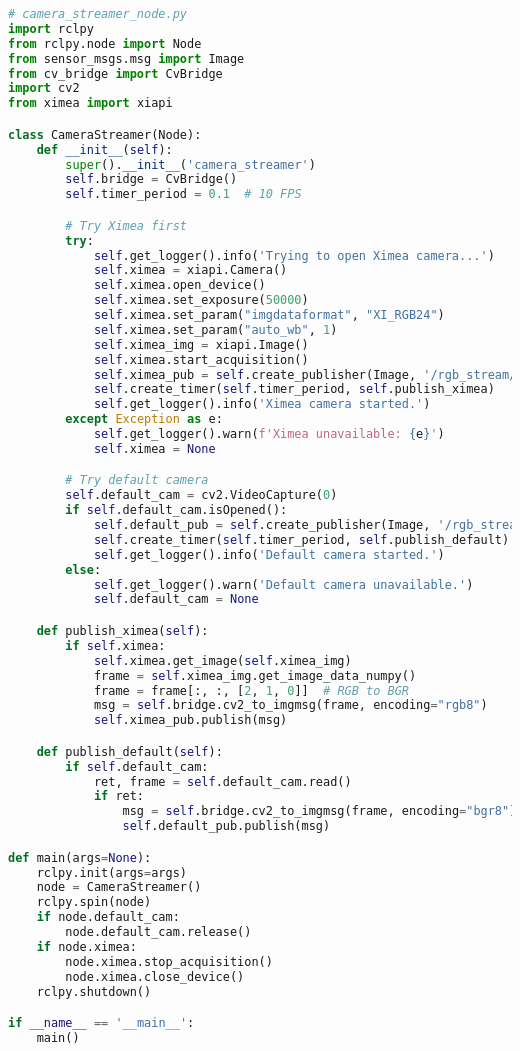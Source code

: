 \begin{lstlisting}[language=Python, caption={Python publisher snímok z kamier}, label={lst:emotion-recognition}]
# camera_streamer_node.py
import rclpy
from rclpy.node import Node
from sensor_msgs.msg import Image
from cv_bridge import CvBridge
import cv2
from ximea import xiapi

class CameraStreamer(Node):
    def __init__(self):
        super().__init__('camera_streamer')
        self.bridge = CvBridge()
        self.timer_period = 0.1  # 10 FPS

        # Try Ximea first
        try:
            self.get_logger().info('Trying to open Ximea camera...')
            self.ximea = xiapi.Camera()
            self.ximea.open_device()
            self.ximea.set_exposure(50000)
            self.ximea.set_param("imgdataformat", "XI_RGB24")
            self.ximea.set_param("auto_wb", 1)
            self.ximea_img = xiapi.Image()
            self.ximea.start_acquisition()
            self.ximea_pub = self.create_publisher(Image, '/rgb_stream/ximea', 10)
            self.create_timer(self.timer_period, self.publish_ximea)
            self.get_logger().info('Ximea camera started.')
        except Exception as e:
            self.get_logger().warn(f'Ximea unavailable: {e}')
            self.ximea = None

        # Try default camera
        self.default_cam = cv2.VideoCapture(0)
        if self.default_cam.isOpened():
            self.default_pub = self.create_publisher(Image, '/rgb_stream/default', 10)
            self.create_timer(self.timer_period, self.publish_default)
            self.get_logger().info('Default camera started.')
        else:
            self.get_logger().warn('Default camera unavailable.')
            self.default_cam = None

    def publish_ximea(self):
        if self.ximea:
            self.ximea.get_image(self.ximea_img)
            frame = self.ximea_img.get_image_data_numpy()
            frame = frame[:, :, [2, 1, 0]]  # RGB to BGR
            msg = self.bridge.cv2_to_imgmsg(frame, encoding="rgb8")
            self.ximea_pub.publish(msg)

    def publish_default(self):
        if self.default_cam:
            ret, frame = self.default_cam.read()
            if ret:
                msg = self.bridge.cv2_to_imgmsg(frame, encoding="bgr8")
                self.default_pub.publish(msg)

def main(args=None):
    rclpy.init(args=args)
    node = CameraStreamer()
    rclpy.spin(node)
    if node.default_cam:
        node.default_cam.release()
    if node.ximea:
        node.ximea.stop_acquisition()
        node.ximea.close_device()
    rclpy.shutdown()

if __name__ == '__main__':
    main()
  
\end{lstlisting}